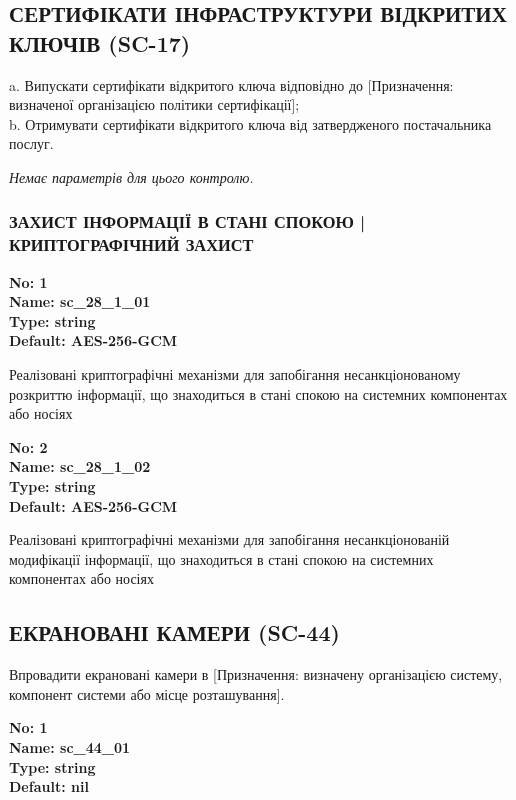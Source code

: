 \documentclass{article}
\begin{document}
\subsection{СЕРТИФІКАТИ ІНФРАСТРУКТУРИ ВІДКРИТИХ КЛЮЧІВ (SC-17)}
a. Випускати сертифікати відкритого ключа відповідно до [Призначення: визначеної організацією політики сертифікації];\\ 
b. Отримувати сертифікати відкритого ключа від затвердженого постачальника послуг.

\vspace{10pt}
\textit{Немає параметрів для цього контролю.}
\vspace{10pt}


\subsubsection{ЗАХИСТ ІНФОРМАЦІЇ В СТАНІ СПОКОЮ | КРИПТОГРАФІЧНИЙ ЗАХИСТ}


\vspace{10pt}
{\footnotesize\bfseries
No: 1\\
Name: sc\_28\_1\_01\\
Type: string\\
Default: \textquotedbl{}AES-256-GCM\textquotedbl{}
}

{\footnotesize Реалізовані криптографічні механізми для запобігання несанкціонованому розкриттю інформації, що знаходиться в стані спокою на системних компонентах або носіях}


{\footnotesize\bfseries
No: 2\\
Name: sc\_28\_1\_02\\
Type: string\\
Default: \textquotedbl{}AES-256-GCM\textquotedbl{}
}

{\footnotesize Реалізовані криптографічні механізми для запобігання несанкціонованій модифікації інформації, що знаходиться в стані спокою на системних компонентах або носіях}




\subsection{ЕКРАНОВАНІ КАМЕРИ (SC-44)}
Впровадити екрановані камери в [Призначення: визначену організацією систему, компонент системи або місце розташування].

\vspace{10pt}
{\footnotesize\bfseries
No: 1\\
Name: sc\_44\_01\\
Type: string\\
Default: nil
}
\end{document}

